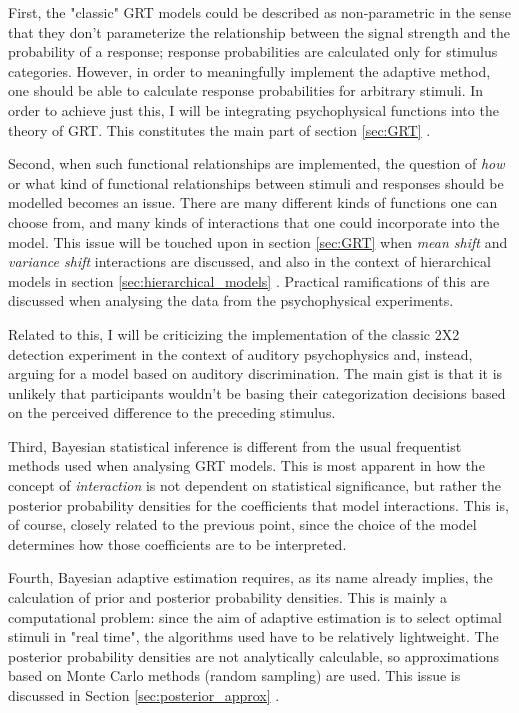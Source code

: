 \documentclass{article}\usepackage{knitr}
\begin{document}
First, the "classic" GRT models could be described as non-parametric in the sense that they don't parameterize the relationship between the signal strength and the probability of a response; response probabilities are calculated only for stimulus categories. However, in order to meaningfully implement the adaptive method, one should be able to calculate response probabilities for arbitrary stimuli. In order to achieve just this, I will be integrating psychophysical functions into the theory of GRT. This constitutes the main part of section \ref{sec:GRT} \textit{}.  

Second, when such functional relationships are implemented, the question of \textit{how} or what kind of functional relationships between stimuli and responses should be modelled becomes an issue. There are many different kinds of functions one can choose from, and many kinds of interactions that one could incorporate into the model. This issue will be touched upon in section \ref{sec:GRT} when \textit{mean shift} and \textit{variance shift} interactions are discussed, and also in the context of hierarchical models in section \ref{sec:hierarchical_models} \textit{}. Practical ramifications of this are discussed when analysing the data from the psychophysical experiments. 

Related to this, I will be criticizing the implementation of the classic 2X2 detection experiment in the context of auditory psychophysics and, instead, arguing for a model based on auditory discrimination. The main gist is that it is unlikely that participants wouldn't be basing their categorization decisions based on the perceived difference to the preceding stimulus.

Third, Bayesian statistical inference is different from the usual frequentist methods used when analysing GRT models. This is most apparent in how the concept of \textit{interaction} is not dependent on statistical significance, but rather the posterior probability densities for the coefficients that model interactions. This is, of course, closely related to the previous point, since the choice of the model determines how those coefficients are to be interpreted. 

Fourth, Bayesian adaptive estimation requires, as its name already implies, the calculation of prior and posterior probability densities. This is mainly a computational problem: since the aim of adaptive estimation is to select optimal stimuli in "real time", the algorithms used have to be relatively lightweight. The posterior probability densities are not analytically calculable, so approximations based on Monte Carlo methods (random sampling) are used. This issue is discussed in Section \ref{sec:posterior_approx} \textit{}.
\end{document}

